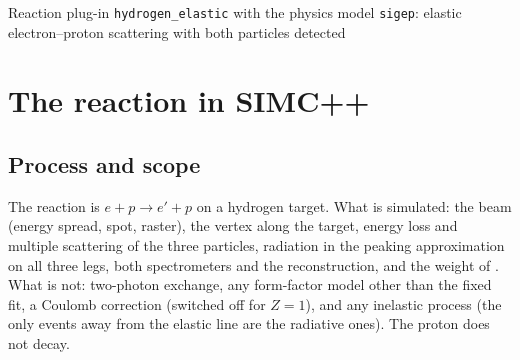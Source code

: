 \documentclass{simcnote}
\begin{document}
%
  {Reaction plug-in \texttt{hydrogen\_elastic} with the physics model \texttt{sigep}: elastic electron--proton
   scattering with both particles detected}
\simcnotemaketitle
{}
\simcnotetoc

\section{The reaction in SIMC++}

\subsection{Process and scope}
The reaction is $e + p \to e' + p$ on a hydrogen target. What is simulated: the beam (energy spread, spot, raster), the
vertex along the target, energy loss and multiple scattering of the three particles, radiation in the peaking
approximation on all three legs, both spectrometers and the reconstruction, and the weight of . What is
not: two-photon exchange, any form-factor model other than the fixed fit, a Coulomb correction (switched off for $Z=1$),
and any inelastic process (the only events away from the elastic line are the radiative ones). The proton does not
decay.
\end{document}
